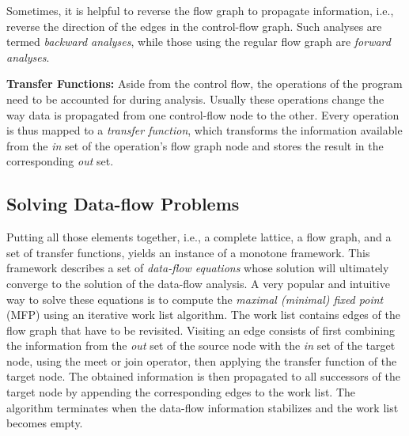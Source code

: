 Sometimes, it is helpful to reverse the flow graph to propagate information,
i.e., reverse the direction of the edges in the control-flow graph. Such
analyses are termed \emph{backward analyses}, while those using the
regular flow graph are \emph{forward analyses}.

\textbf{Transfer Functions:}
Aside from the control flow, the operations of the program
need to be accounted for during analysis.
Usually these operations change the way data is propagated from one control-flow node to the other. Every operation is thus mapped
to a \emph{transfer function}, which transforms the information available from
the \emph{in} set of the operation's flow graph node and stores the result in
the corresponding \emph{out} set.

\subsection{Solving Data-flow Problems}

Putting all those elements together, i.e., a complete lattice, a flow graph, and
a set of transfer functions, yields an instance of a monotone framework.
This framework describes a set of \emph{data-flow equations} whose solution will
ultimately converge to the solution of the data-flow analysis. A very popular and
intuitive way to solve these equations is to compute the \emph{maximal (minimal) fixed point}
(MFP) using
an iterative work list algorithm. The work list contains edges of the flow graph
that have to be revisited.
Visiting an edge consists of first combining the information from the \emph{out}
set of the source node with the \emph{in} set of the target node,
using the meet or join operator, then applying the transfer function of the
target node. The obtained information is then propagated to all successors
of the target node by appending the corresponding edges to the work list.
The algorithm terminates when the data-flow information stabilizes and the work
list becomes empty.

